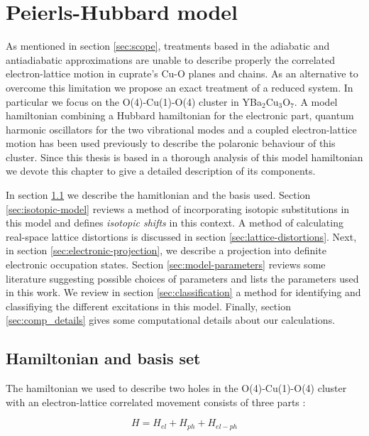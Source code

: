 \chapter{Peierls-Hubbard model}
\label{chap:model}

As mentioned in section \ref{sec:scope}, treatments based in the adiabatic and antiadiabatic approximations are unable to describe properly the correlated electron-lattice motion in cuprate's Cu-O planes and chains.
As an alternative to overcome this limitation we propose an exact treatment of a reduced system.
In particular we focus on the O(4)-Cu(1)-O(4) cluster in YBa$_2$Cu$_3$O$_7$.
A model hamiltonian combining a Hubbard hamiltonian for the electronic part, quantum harmonic oscillators for the two vibrational modes and a coupled electron-lattice motion has been used previously to describe the polaronic behaviour of this cluster.
Since this thesis is based in a thorough analysis of this model hamiltonian we devote this chapter to give a detailed description of its components.

In section \ref{sec:hamiltonian-and-basis} we describe the hamitlonian and the basis used. 
Section \ref{sec:isotopic-model} reviews a method of incorporating isotopic substitutions in this model and defines \textit{isotopic shifts} in this context.
A method of calculating real-space lattice distortions is discussed in section \ref{sec:lattice-distortions}.
Next, in section \ref{sec:electronic-projection}, we describe a projection into definite electronic occupation states.
Section \ref{sec:model-parameters} reviews some literature suggesting possible choices of parameters and lists the parameters used in this work.
We review in section \ref{sec:classification} a method for identifying and classifiying the different excitations in this model.
Finally, section \ref{sec:comp_details} gives some computational details about our calculations.

\section{Hamiltonian and basis set}
\label{sec:hamiltonian-and-basis}

The hamiltonian we used to describe two holes in the O(4)-Cu(1)-O(4) cluster with an electron-lattice correlated movement consists of three parts \cite{Salkola1994}:

\begin{equation}
  \label{eq:full-hamiltonian}
  H = H_{el} + H_{ph} + H_{el-ph}
\end{equation}

